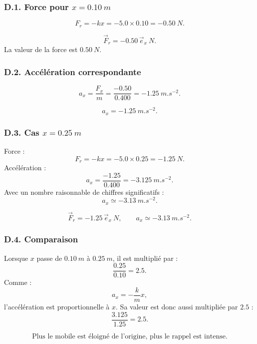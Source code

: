 \documentclass[11pt,a4paper]{article}
\begin{document}
\subsubsection*{D.1. Force pour $x=\SI{0.10}{m}$}

\[
F_r=-kx=-5.0\times 0.10=-0.50\ \si{N}.
\]

\begin{resultatbox}
\[
\boxed{\vec F_r=-0.50\,\vec e_x\ \si{N}.}
\]
La valeur de la force est $\boxed{0.50\ \si{N}}$.
\end{resultatbox}

\subsubsection*{D.2. Accélération correspondante}

\[
a_x=\frac{F_x}{m}=\frac{-0.50}{0.400}=-1.25\ \si{m.s^{-2}}.
\]

\begin{resultatbox}
\[
\boxed{a_x=-1.25\ \si{m.s^{-2}}.}
\]
\end{resultatbox}

\subsubsection*{D.3. Cas $x=\SI{0.25}{m}$}

Force :
\[
F_r=-kx=-5.0\times 0.25=-1.25\ \si{N}.
\]
Accélération :
\[
a_x=\frac{-1.25}{0.400}=-3.125\ \si{m.s^{-2}}.
\]
Avec un nombre raisonnable de chiffres significatifs :
\[
a_x\simeq -3.13\ \si{m.s^{-2}}.
\]

\begin{resultatbox}
\[
\boxed{\vec F_r=-1.25\,\vec e_x\ \si{N}},
\qquad
\boxed{a_x\simeq -3.13\ \si{m.s^{-2}}.}
\]
\end{resultatbox}

\subsubsection*{D.4. Comparaison}

Lorsque $x$ passe de $\SI{0.10}{m}$ à $\SI{0.25}{m}$, il est multiplié par :
\[
\frac{0.25}{0.10}=2.5.
\]
Comme :
\[
a_x=-\frac{k}{m}x,
\]
l'accélération est proportionnelle à $x$. Sa valeur est donc aussi multipliée par $2.5$ :
\[
\frac{3.125}{1.25}=2.5.
\]

\begin{resultatbox}
\[
\boxed{\text{Plus le mobile est éloigné de l'origine, plus le rappel est intense.}}
\]
\end{resultatbox}
\end{document}
